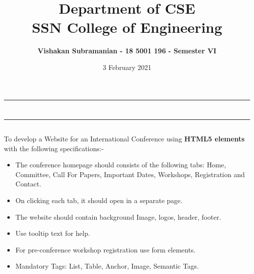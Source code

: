\documentclass[12pt, a4]{article}
\title{\textbf{Department of CSE\\SSN College of Engineering}}
\author{\textbf{Vishakan Subramanian - 18 5001 196 - Semester VI}}
\date{3 February 2021}
\begin{document}
\maketitle
\hrule
\section*{}
\hrule
\bigskip

\subsection*{}
\subsection*{}
\begin{flushleft}
To develop a Website for an International Conference using \textbf{HTML5 elements} with the following specifications:-

\begin{itemize}
\item The conference homepage should consists of the following tabs:
Home, Committee, Call For Papers, Important Dates, Workshops,
Registration and Contact.
\item On clicking each tab, it should open in a separate page.
\item The website should contain background Image, logos, header, footer.
\item Use tooltip text for help.
\item For pre-conference workshop registration use form elements.
\item Mandatory Tags: List, Table, Anchor, Image, Semantic Tags.
\end{itemize}
 
\end{flushleft}

\newpage
\subsection*{}
\begin{flushleft}

\end{flushleft}

\newpage
\subsection*{}
\begin{flushleft}

\end{flushleft}
\end{document}
